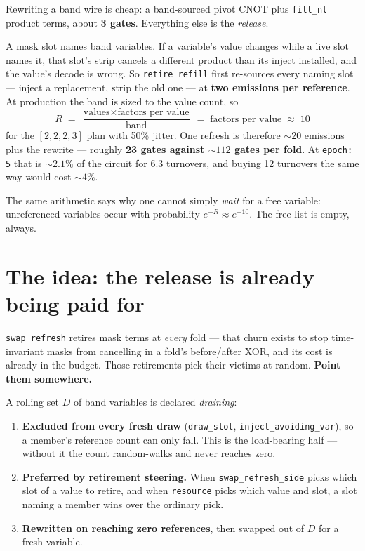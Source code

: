 \documentclass[11pt]{article}
\begin{document}
Rewriting a band wire is cheap: a band-sourced pivot CNOT plus \texttt{fill\_nl}
product terms, about \textbf{3 gates}. Everything else is the \emph{release}.

A mask slot names band variables. If a variable's value changes while a live
slot names it, that slot's strip cancels a different product than its inject
installed, and the value's decode is wrong. So \texttt{retire\_refill} first
re-sources every naming slot --- inject a replacement, strip the old one --- at
\textbf{two emissions per reference}. At production the band is sized to the
value count, so
\[
  R \;=\; \frac{\text{values} \times \text{factors per value}}{\text{band}}
    \;=\; \text{factors per value} \;\approx\; 10
\]
for the $[2,2,2,3]$ plan with 50\% jitter. One refresh is therefore ${\sim}20$
emissions plus the rewrite --- roughly \textbf{23 gates against ${\sim}112$
gates per fold}. At \texttt{epoch:\,5} that is ${\sim}2.1\%$ of the circuit for
6.3 turnovers, and buying 12 turnovers the same way would cost ${\sim}4\%$.

The same arithmetic says why one cannot simply \emph{wait} for a free variable:
unreferenced variables occur with probability $e^{-R} \approx e^{-10}$. The
free list is empty, always.

\section{The idea: the release is already being paid for}

\texttt{swap\_refresh} retires mask terms at \emph{every} fold --- that churn
exists to stop time-invariant masks from cancelling in a fold's before/after
XOR, and its cost is already in the budget. Those retirements pick their
victims at random. \textbf{Point them somewhere.}

A rolling set $D$ of band variables is declared \emph{draining}:
\begin{enumerate}
\item \textbf{Excluded from every fresh draw} (\texttt{draw\_slot},
\texttt{inject\_avoiding\_var}), so a member's reference count can only fall.
This is the load-bearing half --- without it the count random-walks and never
reaches zero.
\item \textbf{Preferred by retirement steering.} When
\texttt{swap\_refresh\_side} picks which slot of a value to retire, and when
\texttt{resource} picks which value and slot, a slot naming a member wins over
the ordinary pick.
\item \textbf{Rewritten on reaching zero references}, then swapped out of $D$
for a fresh variable.
\end{enumerate}
\end{document}
